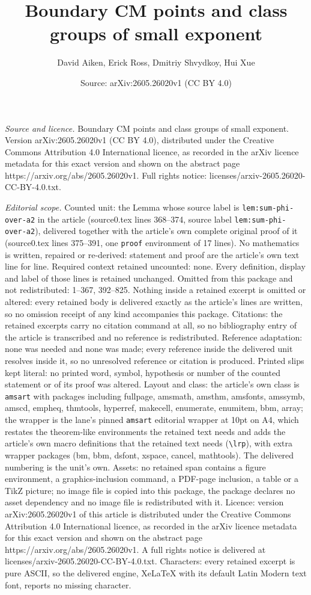 \documentclass[10pt,a4paper]{amsart}
\title[Boundary CM points and class groups of small exponent]{Boundary CM points and class groups of small exponent}
\author{David Aiken, Erick Ross, Dmitriy Shvydkoy, Hui Xue}
\date{Source: arXiv:2605.26020v1 (CC BY 4.0)}
\begin{document}
\maketitle

\noindent\emph{Source and licence.} Boundary CM points and class groups of small exponent. Version arXiv:2605.26020v1 (CC BY 4.0), distributed under the Creative Commons Attribution 4.0 International licence, as recorded in the arXiv licence metadata for this exact version and shown on the abstract page https://arxiv.org/abs/2605.26020v1. Full rights notice: licenses/arxiv-2605.26020-CC-BY-4.0.txt.\par\smallskip

\noindent\textit{Editorial scope.} Counted unit: the Lemma whose source label is \texttt{lem:sum-phi-over-a2} in the article (source0.tex lines 368--374, source label \texttt{lem:sum-phi-over-a2}), delivered together with the article's own complete original proof of it (source0.tex lines 375--391, one \texttt{proof} environment of 17 lines). No mathematics is written, repaired or re-derived: statement and proof are the article's own text line for line. Required context retained uncounted: none. Every definition, display and label of those lines is retained unchanged. Omitted from this package and not redistributed: 1--367, 392--825. Nothing inside a retained excerpt is omitted or altered: every retained body is delivered exactly as the article's lines are written, so no omission receipt of any kind accompanies this package. Citations: the retained excerpts carry no citation command at all, so no bibliography entry of the article is transcribed and no reference is redistributed. Reference adaptation: none was needed and none was made; every reference inside the delivered unit resolves inside it, so no unresolved reference or citation is produced. Printed slips kept literal: no printed word, symbol, hypothesis or number of the counted statement or of its proof was altered. Layout and class: the article's own class is \texttt{amsart} with packages including fullpage, amsmath, amsthm, amsfonts, amssymb, amscd, empheq, thmtools, hyperref, makecell, enumerate, enumitem, bbm, array; the wrapper is the lane's pinned \texttt{amsart} editorial wrapper at 10pt on A4, which restates the theorem-like environments the retained text needs and adds the article's own macro definitions that the retained text needs (\texttt{\textbackslash lrp}), with extra wrapper packages (bm, bbm, dsfont, xspace, cancel, mathtools). The delivered numbering is the unit's own. Assets: no retained span contains a figure environment, a graphics-inclusion command, a PDF-page inclusion, a table or a TikZ picture; no image file is copied into this package, the package declares no asset dependency and no image file is redistributed with it. Licence: version arXiv:2605.26020v1 of this article is distributed under the Creative Commons Attribution 4.0 International licence, as recorded in the arXiv licence metadata for this exact version and shown on the abstract page https://arxiv.org/abs/2605.26020v1. A full rights notice is delivered at licenses/arxiv-2605.26020-CC-BY-4.0.txt. Characters: every retained excerpt is pure ASCII, so the delivered engine, XeLaTeX with its default Latin Modern text font, reports no missing character.
\end{document}
